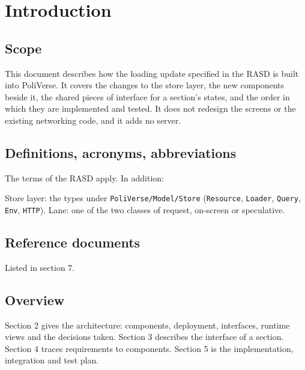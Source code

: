\section{Introduction}

\subsection{Scope}
This document describes how the loading update specified in the RASD is built into
PoliVerse. It covers the changes to the store layer, the new components beside it,
the shared pieces of interface for a section's states, and the order in which they
are implemented and tested. It does not redesign the screens or the existing
networking code, and it adds no server.

\subsection{Definitions, acronyms, abbreviations}
The terms of the RASD apply. In addition:
\printterms

\noindent Store layer: the types under \texttt{PoliVerse/Model/Store}
(\texttt{Resource}, \texttt{Loader}, \texttt{Query}, \texttt{Env}, \texttt{HTTP}).
Lane: one of the two classes of request, on-screen or speculative.

\subsection{Reference documents}
Listed in section 7.

\subsection{Overview}
Section 2 gives the architecture: components, deployment, interfaces, runtime views
and the decisions taken. Section 3 describes the interface of a section. Section 4
traces requirements to components. Section 5 is the implementation, integration and
test plan.
